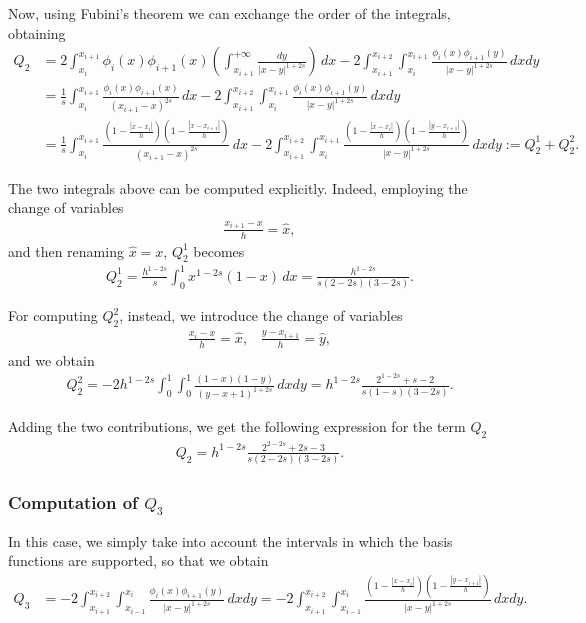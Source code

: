 {Now, using Fubini's theorem we can exchange the order of the integrals, obtaining 
\begin{align*}
	Q_2 &= 2\int_{x_i}^{x_{i+1}}\phi_i(x)\phi_{i+1}(x)\left(\int_{x_{i+1}}^{+\infty} \frac{dy}{|x-y|^{1+2s}}\right)\,dx - 2\int_{x_{i+1}}^{x_{i+2}}\int_{x_i}^{x_{i+1}} \frac{\phi_i(x)\phi_{i+1}(y)}{|x-y|^{1+2s}}\,dxdy 
	\\
	&= \frac{1}{s}\int_{x_i}^{x_{i+1}}\frac{\phi_i(x)\phi_{i+1}(x)}{(x_{i+1}-x)^{2s}}\,dx - 2\int_{x_{i+1}}^{x_{i+2}}\int_{x_i}^{x_{i+1}} \frac{\phi_i(x)\phi_{i+1}(y)}{|x-y|^{1+2s}}\,dxdy
	\\
	&= \frac{1}{s}\int_{x_i}^{x_{i+1}}\frac{\left(1-\frac{|x-x_i|}{h}\right)\left(1-\frac{|x-x_{i+1}|}{h}\right)}{(x_{i+1}-x)^{2s}}\,dx - 2\int_{x_{i+1}}^{x_{i+2}}\int_{x_i}^{x_{i+1}} \frac{\left(1-\frac{|x-x_i|}{h}\right)\left(1-\frac{|y-x_{i+1}|}{h}\right)}{|x-y|^{1+2s}}\,dxdy:= Q_2^1 + Q_2^2.
\end{align*}

The two integrals above can be computed explicitly. Indeed, employing the change of variables
\begin{align*}
	\frac{x_{i+1}-x}{h}=\hat{x},
\end{align*}
and then renaming $\hat{x}=x$, $Q_2^1$ becomes
\begin{align*}
	Q_2^1=\frac{h^{1-2s}}{s}\int_0^1 x^{1-2s}(1-x)\,dx = \frac{h^{1-2s}}{s(2-2s)(3-2s)}.
\end{align*}

For computing $Q_2^2$, instead, we introduce the change of variables
\begin{align}\label{cv3}
	\frac{x_i-x}{h}=\hat{x},\;\;\;\frac{y-x_{i+1}}{h}=\hat{y},
\end{align}
and we obtain
\begin{align*}
	Q_2^2 = -2h^{1-2s}\int_0^1\int_0^1\frac{(1-x)(1-y)}{(y-x+1)^{1+2s}}\,dxdy = h^{1-2s}\frac{2^{1-2s}+s-2}{s(1-s)(3-2s)}.
\end{align*}

Adding the two contributions, we get the following expression for the term $Q_2$
\begin{align*}
	Q_2 = h^{1-2s}\frac{2^{2-2s}+2s-3}{s(2-2s)(3-2s)}.
\end{align*}

\subsubsection*{Computation of $Q_3$}
In this case, we simply take into account the intervals in which the basis functions are supported, so that we obtain
\begin{align*}
	Q_3 &= -2\int_{x_{i+1}}^{x_{i+2}}\int_{x_{i-1}}^{x_i} \frac{\phi_i(x)\phi_{i+1}(y)}{|x-y|^{1+2s}}\,dxdy = - 2\int_{x_{i+1}}^{x_{i+2}}\int_{x_{i-1}}^{x_i} \frac{\left(1-\frac{|x-x_i|}{h}\right)\left(1-\frac{|y-x_{i+1}|}{h}\right)}{|x-y|^{1+2s}}\,dxdy.
\end{align*}

}

